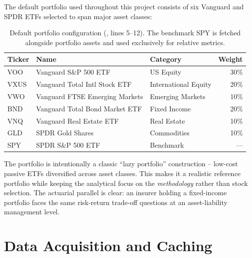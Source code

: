 The default portfolio used throughout this project consists of six Vanguard and SPDR ETFs selected to span major asset classes:

\begin{table}[h]
\centering
\small
\begin{tabular}{lllr}
\toprule
\textbf{Ticker} & \textbf{Name} & \textbf{Category} & \textbf{Weight} \\
\midrule
VOO  & Vanguard S\&P 500 ETF             & US Equity             & 30\% \\
VXUS & Vanguard Total Intl Stock ETF     & International Equity  & 20\% \\
VWO  & Vanguard FTSE Emerging Markets    & Emerging Markets      & 10\% \\
BND  & Vanguard Total Bond Market ETF    & Fixed Income          & 20\% \\
VNQ  & Vanguard Real Estate ETF          & Real Estate           & 10\% \\
GLD  & SPDR Gold Shares                  & Commodities           & 10\% \\
\midrule
SPY  & SPDR S\&P 500 ETF                 & Benchmark             & ---  \\
\bottomrule
\end{tabular}
\caption{Default portfolio configuration (, lines 5--12). The benchmark SPY is fetched alongside portfolio assets and used exclusively for relative metrics.}
\label{tab:portfolio-config}
\end{table}

\begin{keyinsight}
  The portfolio is intentionally a classic ``lazy portfolio'' construction -- low-cost passive ETFs diversified across asset classes. This makes it a realistic reference portfolio while keeping the analytical focus on the \emph{methodology} rather than stock selection. The actuarial parallel is clear: an insurer holding a fixed-income portfolio faces the same risk-return trade-off questions at an asset-liability management level.
\end{keyinsight}

\section{Data Acquisition and Caching}
\label{sec:portfolio-data}

